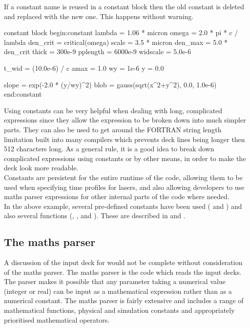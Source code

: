 If a constant name is reused in a constant block then the old constant is
deleted and replaced with the new one. This happens without warning.
\begin{lboxverbatim}{constant block}
begin:constant
   lambda = 1.06 * micron
   omega = 2.0 * pi * c / lambda
   den_crit = critical(omega)
   scale = 3.5 * micron
   den_max = 5.0 * den_crit
   thick = 300e-9
   pplength = 6000e-9
   widscale = 5.0e-6

   t_wid = (10.0e-6) / c
   amax = 1.0
   wy = 1e-6
   y = 0.0

   slope = exp(-2.0 * (y/wy)^2)
   blob = gauss(sqrt(x^2+y^2), 0.0, 1.0e-6)
end:constant
\end{lboxverbatim}

Using constants can be very helpful when dealing with long,
complicated expressions since they allow the expression to be broken down into
much simpler parts. They can also be used to get around the FORTRAN string
length limitation built into many compilers which prevents deck lines being
longer then 512 characters long. As a general rule, it is a good idea to break
down complicated expressions using constants or by other means, in order to
make the deck look more readable.\\

Constants are persistent for the entire runtime of the code,
allowing them to be used when specifying time profiles for lasers, and also
allowing developers to use maths parser expressions for other internal parts of
the code where needed.\\

In the above example, several pre-defined constants have been used
( and ) and also several functions
(, ,  and
). These are described in  and
.

\subsection{The maths parser}
\label{sec:maths_parser}
A discussion of the input deck for {\EPOCH} would not be complete without
consideration of the maths parser. The maths parser is the code which reads
the input decks.
The parser makes it possible that any parameter taking a
numerical value (integer or real) can be input as a mathematical expression
rather than as a numerical constant. The maths parser is fairly extensive and
includes a range of mathematical functions, physical and simulation constants
and appropriately prioritised mathematical operators.


